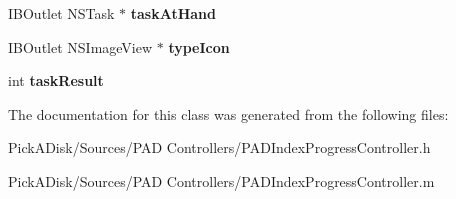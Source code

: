 \begin{DoxyCompactItemize}
\item 
\hypertarget{interface_p_a_d_index_progress_controller_a5b8e91c7450f9cdb02110e6df6bc4883}{
IBOutlet NSTask $\ast$ {\bfseries taskAtHand}}
\label{interface_p_a_d_index_progress_controller_a5b8e91c7450f9cdb02110e6df6bc4883}

\item 
\hypertarget{interface_p_a_d_index_progress_controller_a1b5b9def4506b57b8dc076ee1bafaf0a}{
IBOutlet NSImageView $\ast$ {\bfseries typeIcon}}
\label{interface_p_a_d_index_progress_controller_a1b5b9def4506b57b8dc076ee1bafaf0a}

\item 
\hypertarget{interface_p_a_d_index_progress_controller_ace0176fc6faf864f20b93141f55e39cb}{
int {\bfseries taskResult}}
\label{interface_p_a_d_index_progress_controller_ace0176fc6faf864f20b93141f55e39cb}

\end{DoxyCompactItemize}


The documentation for this class was generated from the following files:\begin{DoxyCompactItemize}
\item 
PickADisk/Sources/PAD Controllers/PADIndexProgressController.h\item 
PickADisk/Sources/PAD Controllers/PADIndexProgressController.m\end{DoxyCompactItemize}
